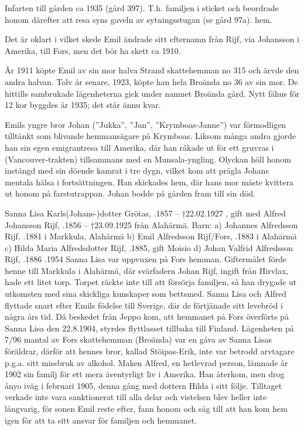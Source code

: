 Infarten till gården ca 1935 (gård 397). T.h. familjen i sticket och beordrade honom därefter att resa syns gaveln av sytningsstugan (se gård 97a). hem.

Det är oklart i vilket skede Emil ändrade sitt efternamn från Rijf, via Johansson i Amerika, till Fors, men det bör ha skett ca 1910.

År 1911 köpte Emil av sin mor halva Strand skattehemman no 315 och ärvde den andra halvan. Tolv år senare, 1923, köpte han hela Broända no 36 av sin mor. De hittills sambrukade lägenheterna gick under namnet Broända gård. Nytt fähus för 12 kor byggdes år 1935; det står ännu kvar.

Emils yngre bror Johan (”Jukka”, ”Jan”, ”Krymboas-Janne”) var förmodligen tilltänkt som blivande hemmansägare på Krymboas. Liksom många andra gjorde han sin egen emigrantresa till Amerika, där han råkade ut för ett gruvras i (Vancouver-trakten) tillsammans med en Munsala-yngling. Olyckan höll honom instängd med sin döende kamrat i tre dygn, vilket kom att prägla Johans mentala hälsa i fortsättningen. Han skickades hem, där hans mor måste kvittera ut honom på farstutrappan. Johan bodde på gården fram till sin död.


Sanna Lisa Karls(Johans-)dotter Grötas, .1857 – †22.02.1927 , gift med Alfred Johansson Rijf, .1856 – †23.09.1925 från Alahärmä.
Barn: a) Johannes Alfredsson Rijf, .1881 i Markkula, Alahärmä
b) Emil Alfredsson Rijf/Fors, .1883 i Alahärmä
c) Hilda Maria Alfredsdotter Rijf, .1885, gift Moisio d) Johan Valfrid Alfredsson Rijf, .1886 .1954
Sanna Lisa var uppvuxen på Fors hemman. Giftermålet förde henne till Markkula i Alahärmä, där svärfadern Johan Rijf, ingift från Hirvlax, hade ett litet torp. Torpet räckte inte till att försörja familjen, så han drygade ut utkomsten med sina skickliga kunskaper som bettsmed.
Sanna Lisa och Alfred flyttade snart efter Emils födelse till Sverige, där de förtjänade sitt levebröd i några års tid. Då beskedet från Jeppo kom, att hemmanet på Fors överförts på Sanna Lisa den 22.8.1904, styrdes flyttlasset tillbaka till Finland. Lägenheten på 7/96 mantal av Fors skattehemman (Broända) var en gåva av Sanna Lisas föräldrar, därför att hennes bror, kallad Stöipas-Erik, inte var betrodd arvtagare p.g.a. sitt missbruk av alkohol.
Maken Alfred, en hetlevrad person, lämnade år 1902 sin familj för ett mera äventyrligt liv i Amerika. Han återkom, men drog ånyo iväg i februari 1905, denna gång med dottern Hilda i sitt följe. Tilltaget verkade inte vara sanktionerat till alla delar och vistelsen blev heller inte långvarig, för sonen Emil reste efter, fann honom och såg till att han kom hem igen för att ta sitt ansvar för familjen och hemmanet.

